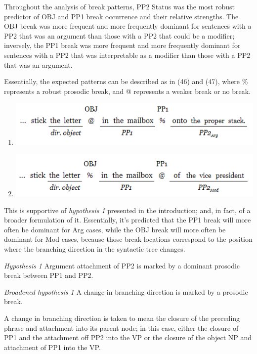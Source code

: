 \documentclass[12pt,oneside]{book}
\begin{document}
Throughout the analysis of break patterns, PP2 Status was the most robust predictor of OBJ and PP1 break occurrence and their relative strengths. The OBJ break was more frequent and more frequently dominant for sentences with a PP2 that was an argument than those with a PP2 that could be a modifier; inversely, the PP1 break was more frequent and more frequently dominant for sentences with a PP2 that was interpretable as a modifier than those with a PP2 that was an argument.

Essentially, the expected patterns can be described as in (46) and (47), where \% represents a robust prosodic break, and @ represents a weaker break or no break.

\begin{enumerate}
\def\labelenumi{(\arabic{enumi})}
\setcounter{enumi}{45}
\item
  \includegraphics{breakpat1.png}
\item
  \includegraphics{breakpat2.png}
\end{enumerate}

This is supportive of \emph{hypothesis 1} presented in the introduction; and, in fact, of a broader formulation of it. Essentially, it's predicted that the PP1 break will more often be dominant for Arg cases, while the OBJ break will more often be dominant for Mod cases, because those break locations correspond to the position where the branching direction in the syntactic tree changes.

\emph{Hypothesis 1} \hfill\linebreak
Argument attachment of PP2 is marked by a dominant prosodic break between PP1 and PP2.

\emph{Broadened hypothesis 1} \hfill\linebreak
A change in branching direction is marked by a prosodic break.

A change in branching direction is taken to mean the closure of the preceding phrase and attachment into its parent node; in this case, either the closure of PP1 and the attachment off PP2 into the VP or the closure of the object NP and attachment of PP1 into the VP.
\end{document}
